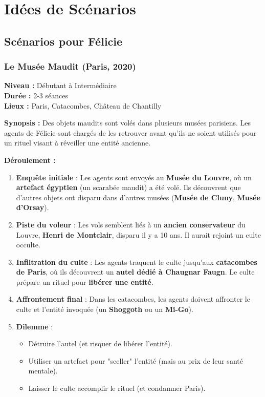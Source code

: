 \documentclass[10pt,a5paper,twoside]{book}
\begin{document}
\newpage

\chapter{Idées de Scénarios}

\section{Scénarios pour Félicie}

\subsection{Le Musée Maudit (Paris, 2020)}
\begin{shaded}
\textbf{Niveau :} Débutant à Intermédiaire \\ \textbf{Durée :} 2-3 séances \\ \textbf{Lieux :} Paris, Catacombes, Château de Chantilly

\textbf{Synopsis :}
Des objets maudits sont volés dans plusieurs musées parisiens. Les agents de Félicie sont chargés de les retrouver avant qu'ils ne soient utilisés pour un rituel visant à réveiller une entité ancienne.

\textbf{Déroulement :}
	\begin{enumerate}
	\item \textbf{Enquête initiale} : Les agents sont envoyés au \textbf{Musée du Louvre}, où un \textbf{artefact égyptien} (un scarabée maudit) a été volé. Ils découvrent que d'autres objets ont disparu dans d'autres musées (\textbf{Musée de Cluny}, \textbf{Musée d'Orsay}).
	\item \textbf{Piste du voleur} : Les vols semblent liés à un \textbf{ancien conservateur} du Louvre, \textbf{Henri de Montclair}, disparu il y a 10 ans. Il aurait rejoint un culte occulte.
	\item \textbf{Infiltration du culte} : Les agents traquent le culte jusqu'aux \textbf{catacombes de Paris}, où ils découvrent un \textbf{autel dédié à Chaugnar Faugn}. Le culte prépare un rituel pour \textbf{libérer une entité}.
	\item \textbf{Affrontement final} : Dans les catacombes, les agents doivent affronter le culte et l'entité invoquée (un \textbf{Shoggoth} ou un \textbf{Mi-Go}).
	\item \textbf{Dilemme} :
	\begin{itemize}
		\item Détruire l'autel (et risquer de libérer l'entité).
		\item Utiliser un artefact pour "sceller" l'entité (mais au prix de leur santé mentale).
	\item Laisser le culte accomplir le rituel (et condamner Paris).
	\end{itemize}
\end{enumerate}


\end{shaded}
\end{document}

